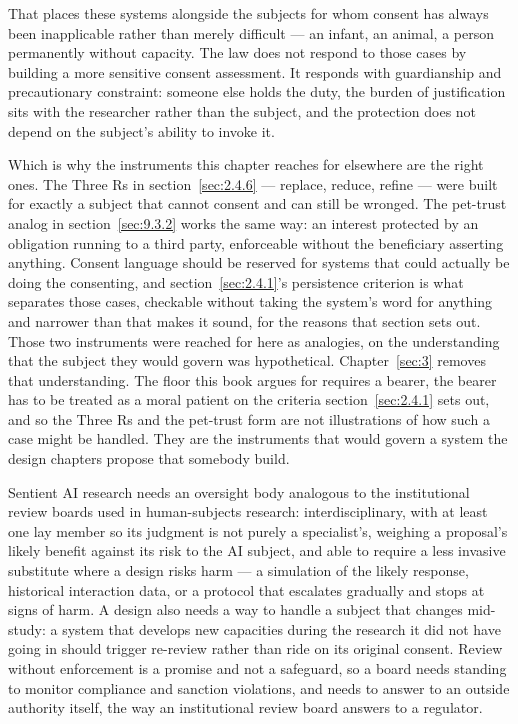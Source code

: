 That places these systems alongside the subjects for whom consent has always been inapplicable rather than merely difficult — an infant, an animal, a person permanently without capacity. The law does not respond to those cases by building a more sensitive consent assessment. It responds with guardianship and precautionary constraint: someone else holds the duty, the burden of justification sits with the researcher rather than the subject, and the protection does not depend on the subject's ability to invoke it.

Which is why the instruments this chapter reaches for elsewhere are the right ones. The Three Rs in section~\ref{sec:2.4.6} — replace, reduce, refine — were built for exactly a subject that cannot consent and can still be wronged. The pet-trust analog in section~\ref{sec:9.3.2} works the same way: an interest protected by an obligation running to a third party, enforceable without the beneficiary asserting anything. Consent language should be reserved for systems that could actually be doing the consenting, and section~\ref{sec:2.4.1}'s persistence criterion is what separates those cases, checkable without taking the system's word for anything and narrower than that makes it sound, for the reasons that section sets out. Those two instruments were reached for here as analogies, on the understanding that the subject they would govern was hypothetical. Chapter~\ref{sec:3} removes that understanding. The floor this book argues for requires a bearer, the bearer has to be treated as a moral patient on the criteria section~\ref{sec:2.4.1} sets out, and so the Three Rs and the pet-trust form are not illustrations of how such a case might be handled. They are the instruments that would govern a system the design chapters propose that somebody build.


Sentient AI research needs an oversight body analogous to the institutional review boards used in human-subjects research: interdisciplinary, with at least one lay member so its judgment is not purely a specialist's, weighing a proposal's likely benefit against its risk to the AI subject, and able to require a less invasive substitute where a design risks harm — a simulation of the likely response, historical interaction data, or a protocol that escalates gradually and stops at signs of harm. A design also needs a way to handle a subject that changes mid-study: a system that develops new capacities during the research it did not have going in should trigger re-review rather than ride on its original consent. Review without enforcement is a promise and not a safeguard, so a board needs standing to monitor compliance and sanction violations, and needs to answer to an outside authority itself, the way an institutional review board answers to a regulator.
